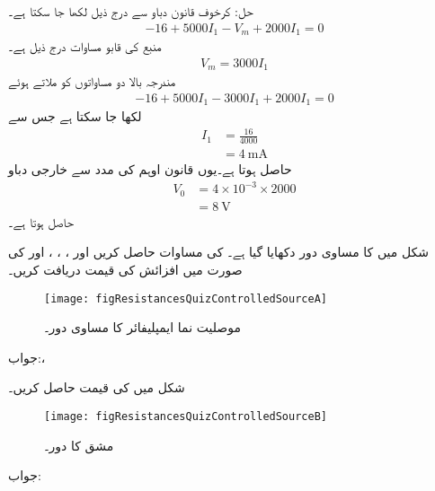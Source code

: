 حل: کرخوف قانون دباو سے درج ذیل لکھا جا سکتا ہے۔
\begin{align*}
-16+5000 I_1-V_m+2000 I_1=0
\end{align*}
منبع کی قابو مساوات درج ذیل ہے۔
\begin{align*}
V_m=3000I_1
\end{align*}
مندرجہ بالا دو مساواتوں کو ملاتے ہوئے
\begin{align*}
-16+5000 I_1-3000I_1+2000 I_1=0
\end{align*}
لکھا جا سکتا ہے جس سے
\begin{align*}
I_1&=\frac{16}{4000}\\
&=\SI{4}{\milli\ampere}
\end{align*}
حاصل ہوتا ہے۔یوں قانون اوہم کی مدد سے خارجی دباو
\begin{align*}
V_0&=4\times 10^{-3} \times 2000\\
&=\SI{8}{\volt}
\end{align*}
حاصل ہوتا ہے۔

شکل  میں  کا مساوی دور دکھایا گیا ہے۔  کی مساوات حاصل کریں اور ، ، ،  اور  کی صورت میں افزائش کی قیمت دریافت کریں۔
\begin{figure}
\centering
\texttt{[image: figResistancesQuizControlledSourceA]}
\caption{موصلیت نما ایمپلیفائر کا مساوی دور۔}
\label{شکل_مزاحمتی-مشق_تابع_الف}
\end{figure}

جواب:، 

شکل  میں  کی قیمت حاصل کریں۔
\begin{figure}
\centering
\texttt{[image: figResistancesQuizControlledSourceB]}
\caption{مشق  کا دور۔}
\label{شکل_مزاحمتی-مشق_تابع_ب}
\end{figure}

جواب:

